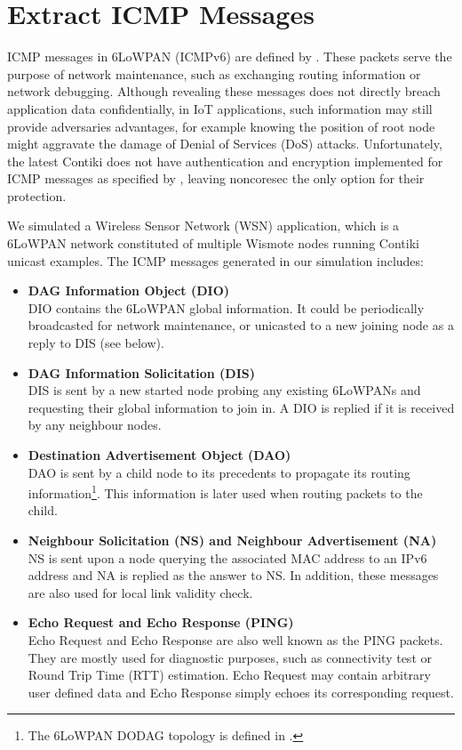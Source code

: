 \section{Extract ICMP Messages}
ICMP messages in 6LoWPAN (ICMPv6) are defined by \cite{rfc4443}. These packets serve the purpose of network maintenance, such as exchanging routing information or network debugging. Although revealing these messages does not directly breach application data confidentially, in IoT applications, such information may still provide adversaries advantages, for example knowing the position of root node might aggravate the damage of Denial of Services (DoS) attacks. Unfortunately, the latest Contiki does not have authentication and encryption implemented for ICMP messages as specified by \cite{rfc2463}, leaving noncoresec the only option for their protection. 

We simulated a Wireless Sensor Network (WSN) application, which is a 6LoWPAN network constituted of multiple Wismote\cite{Wismote} nodes running Contiki unicast examples. The ICMP messages generated in our simulation includes:
\begin{itemize}
	\item \textbf{DAG Information Object (DIO)} \\
	DIO contains the 6LoWPAN global information. It could be periodically broadcasted for network maintenance, or unicasted to a new joining node as a reply to DIS (see below).
	\item \textbf{DAG Information Solicitation (DIS)} \\
	DIS is sent by a new started node probing any existing 6LoWPANs and requesting their global information to join in. A DIO is replied if it is received by any neighbour nodes.
	\item \textbf{Destination Advertisement Object (DAO)} \\
	DAO is sent by a child node to its precedents to propagate its routing information\footnote{The 6LoWPAN DODAG topology is defined in \cite{rfc6550}.}. This information is later used when routing packets to the child.
	\item \textbf{Neighbour Solicitation (NS) and Neighbour Advertisement (NA)} \\
	NS is sent upon a node querying the associated MAC address to an IPv6 address and NA is replied as the answer to NS. In addition, these messages are also used for local link validity check.
	\item \textbf{Echo Request and Echo Response (PING)} \\
	Echo Request and Echo Response are also well known as the PING packets. They are mostly used for diagnostic purposes, such as connectivity test or Round Trip Time (RTT) estimation. Echo Request may contain arbitrary user defined data and Echo Response simply echoes its corresponding request.
\end{itemize}

